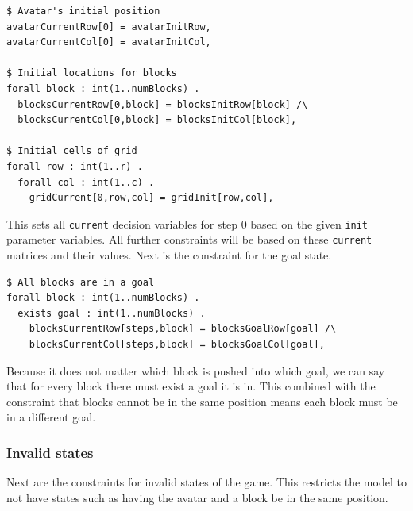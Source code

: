 \documentclass{article}
\begin{document}
\begin{lstlisting}[caption={Constraints for setting initial state variables}, captionpos=b]
$ Avatar's initial position
avatarCurrentRow[0] = avatarInitRow,
avatarCurrentCol[0] = avatarInitCol,

$ Initial locations for blocks
forall block : int(1..numBlocks) .
  blocksCurrentRow[0,block] = blocksInitRow[block] /\
  blocksCurrentCol[0,block] = blocksInitCol[block],

$ Initial cells of grid
forall row : int(1..r) .
  forall col : int(1..c) .
    gridCurrent[0,row,col] = gridInit[row,col],
\end{lstlisting}
This sets all \texttt{current} decision variables for step 0 based on the given \texttt{init} parameter variables. All further constraints will be based on these \texttt{current} matrices and their values. Next is the constraint for the goal state.
\begin{lstlisting}[caption={Constraints for the goal state}, captionpos=b]
$ All blocks are in a goal
forall block : int(1..numBlocks) .
  exists goal : int(1..numBlocks) . 
    blocksCurrentRow[steps,block] = blocksGoalRow[goal] /\
	blocksCurrentCol[steps,block] = blocksGoalCol[goal],
\end{lstlisting}
Because it does not matter which block is pushed into which goal, we can say that for every block there must exist a goal it is in. This combined with the constraint that blocks cannot be in the same position means each block must be in a different goal.
\subsubsection{Invalid states}
Next are the constraints for invalid states of the game. This restricts the model to not have states such as having the avatar and a block be in the same position. 
\end{document}
